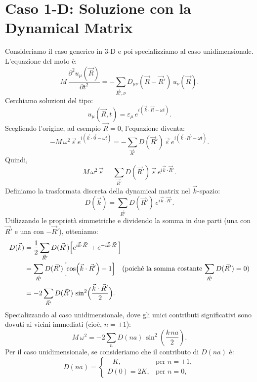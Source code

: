 \section{Caso 1-D: Soluzione con la Dynamical Matrix}
Consideriamo il caso generico in 3-D e poi specializziamo al caso unidimensionale. L'equazione del moto è:
\begin{equation}
    M\,\frac{\partial^2 u_{\mu}(\vec{R})}{\partial t^2} = -\sum_{\vec{R}',\nu} D_{\mu\nu}(\vec{R}-\vec{R}')\, u_{\nu}(\vec{R}).
\end{equation}
Cerchiamo soluzioni del tipo:
\[
u_{\mu}(\vec{R},t) = \varepsilon_{\mu}\, e^{i(\vec{k}\cdot\vec{R} - \omega t)}.
\]
Scegliendo l'origine, ad esempio \(\vec{R}=0\), l'equazione diventa:
\begin{equation}
    -M\,\omega^2\, \vec{\varepsilon}\, e^{i(\vec{k}\cdot\vec{0} - \omega t)} = -\sum_{\vec{R}'} D(\vec{R}')\, \vec{\varepsilon}\, e^{i(\vec{k}\cdot\vec{R}' - \omega t)}.
\end{equation}
Quindi,
\[
M\,\omega^2\, \vec{\varepsilon} = \sum_{\vec{R}'} D(\vec{R}')\, \vec{\varepsilon}\, e^{i\vec{k}\cdot\vec{R}'}.
\]
Definiamo la trasformata discreta della dynamical matrix nel \(\vec{k}\)-spazio:
\[
D(\vec{k}) = \sum_{\vec{R}'} D(\vec{R}')\, e^{i\vec{k}\cdot\vec{R}'}.
\]
Utilizzando le proprietà simmetriche e dividendo la somma in due parti (una con \(\vec{R}'\) e una con \(-\vec{R}'\)), otteniamo:
\begin{equation}
\begin{split}
    D(\vec{k}) &= \frac{1}{2}\sum_{\vec{R}'} D(\vec{R}') \Bigl[e^{i\vec{k}\cdot\vec{R}'} + e^{-i\vec{k}\cdot\vec{R}'}\Bigr] \\
    &= \sum_{\vec{R}'} D(\vec{R}') \Bigl[\cos(\vec{k}\cdot\vec{R}') - 1\Bigr] \quad \text{(poiché la somma costante \(\sum_{\vec{R}'} D(\vec{R}') = 0\))} \\
    &= -2 \sum_{\vec{R}'} D(\vec{R}') \, \sin^2\Bigl(\frac{\vec{k}\cdot\vec{R}'}{2}\Bigr).
\end{split}
\end{equation}
Specializzando al caso unidimensionale, dove gli unici contributi significativi sono dovuti ai vicini immediati (cioè, \(n = \pm 1\)):
\[
M\,\omega^2 = -2 \sum_{n} D(na)\, \sin^2\left(\frac{k\,na}{2}\right).
\]
Per il caso unidimensionale, se consideriamo che il contributo di \(D(na)\) è:
\[
D(na) = \begin{cases}
-K, & \text{per } n = \pm 1, \\
D(0) = 2K, & \text{per } n = 0,
\end{cases}
\]
